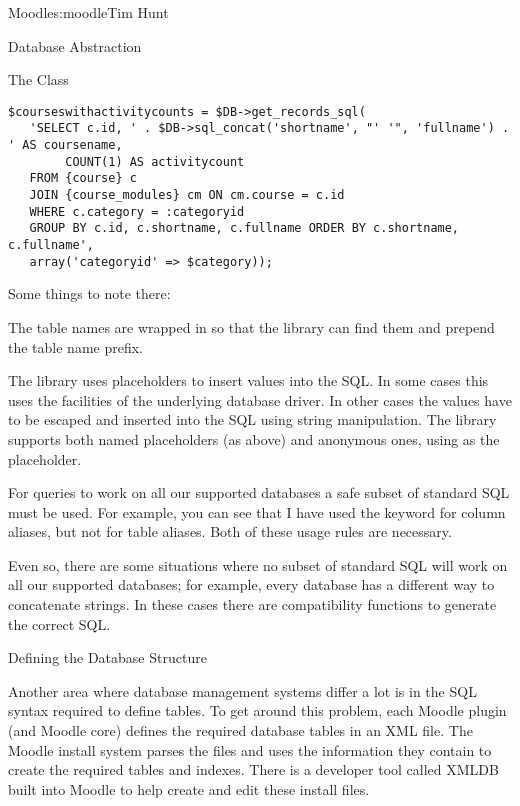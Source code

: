 \begin{aosachapter}{Moodle}{s:moodle}{Tim Hunt}
\begin{aosasect1}{Database Abstraction}
\begin{aosasect2}{The  Class}
\begin{verbatim}
$courseswithactivitycounts = $DB->get_records_sql(
   'SELECT c.id, ' . $DB->sql_concat('shortname', "' '", 'fullname') . ' AS coursename,
        COUNT(1) AS activitycount
   FROM {course} c
   JOIN {course_modules} cm ON cm.course = c.id
   WHERE c.category = :categoryid
   GROUP BY c.id, c.shortname, c.fullname ORDER BY c.shortname, c.fullname',
   array('categoryid' => $category));
\end{verbatim}

\noindent Some things to note there:

\begin{aosaitemize}

\item The table names are wrapped in \code{\{\}} so that the library
  can find them and prepend the table name prefix.

\item The library uses placeholders to insert values into the SQL. In
  some cases this uses the facilities of the underlying database
  driver. In other cases the values have to be escaped and inserted
  into the SQL using string manipulation. The library supports both named placeholders (as
  above) and anonymous ones, using  as the placeholder.

\item For queries to work on all our supported databases a
  safe subset of standard SQL must be used. For example, you can
  see that I have used the  keyword for column aliases, but not for
  table aliases. Both of these usage rules are necessary.

\item Even so, there are some situations where no subset of standard SQL
  will work on all our supported databases; for example, every
  database has a different way to concatenate strings. In these cases there
  are compatibility functions to generate the correct SQL.

\end{aosaitemize}

\end{aosasect2}

\begin{aosasect2}{Defining the Database Structure}

Another area where database management systems differ a lot is in the
SQL syntax required to define tables. To get around this problem, each
Moodle plugin (and Moodle core) defines the required database tables
in an XML file. The Moodle install system parses the  files and uses
the information they contain to create the required tables and indexes.
There is a developer tool called XMLDB built into Moodle to
help create and edit these install files.


\end{aosasect2}
\end{aosasect1}
\end{aosachapter}
